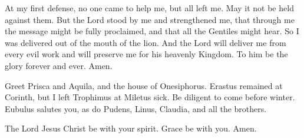  At my first defense, no one came to help me, but all
left me. May it not be held against them.  But the Lord
stood by me and strengthened me, that through me the message might be
fully proclaimed, and that all the Gentiles might hear. So I was
delivered out of the mouth of the lion.  And the Lord
will deliver me from every evil work and will preserve me for his
heavenly Kingdom. To him be the glory forever and ever. Amen.

 Greet Prisca and Aquila, and the house of Onesiphorus.
 Erastus remained at Corinth, but I left Trophimus at
Miletus sick.  Be diligent to come before winter. Eubulus
salutes you, as do Pudens, Linus, Claudia, and all the brothers.

 The Lord Jesus Christ be with your spirit. Grace be with
you. Amen.
